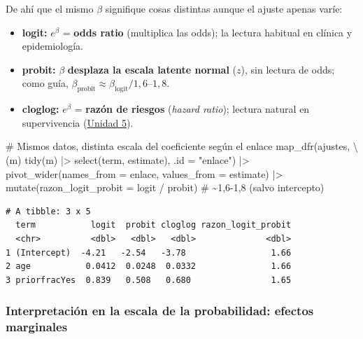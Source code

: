 \documentclass[
  letterpaper,
  DIV=11,
  numbers=noendperiod]{scrartcl}
\newenvironment{Shaded}{\begin{snugshade}}{\end{snugshade}}
\newcommand{\AttributeTok}[1]{\textcolor[rgb]{0.40,0.45,0.13}{#1}}
\newcommand{\CommentTok}[1]{\textcolor[rgb]{0.37,0.37,0.37}{#1}}
\newcommand{\FunctionTok}[1]{\textcolor[rgb]{0.28,0.35,0.67}{#1}}
\newcommand{\NormalTok}[1]{\textcolor[rgb]{0.00,0.23,0.31}{#1}}
\newcommand{\SpecialCharTok}[1]{\textcolor[rgb]{0.37,0.37,0.37}{#1}}
\newcommand{\StringTok}[1]{\textcolor[rgb]{0.13,0.47,0.30}{#1}}
\providecommand{\tightlist}{%
  \setlength{\itemsep}{0pt}\setlength{\parskip}{0pt}}\usepackage{longtable,booktabs,array}
\begin{document}
De ahí que el mismo \(\beta\) signifique cosas distintas aunque el
ajuste apenas varíe:

\begin{itemize}
\tightlist
\item
  \textbf{logit:} \(e^{\beta}\) = \textbf{odds ratio} (multiplica las
  odds); la lectura habitual en clínica y epidemiología.
\item
  \textbf{probit:} \(\beta\) \textbf{desplaza la escala latente normal}
  (\(z\)), sin lectura de odds; como guía,
  \(\beta_{\text{probit}}\approx\beta_{\text{logit}}/1{,}6\text{–}1{,}8\).
\item
  \textbf{cloglog:} \(e^{\beta}\) = \textbf{razón de riesgos}
  (\emph{hazard ratio}); lectura natural en supervivencia
  (\protect\hyperlink{sec-u15}{Unidad 5}).
\end{itemize}

\begin{Shaded}
\begin{Highlighting}[]
\CommentTok{\# Mismos datos, distinta escala del coeficiente según el enlace}
\FunctionTok{map\_dfr}\NormalTok{(ajustes, \textbackslash{}(m) }\FunctionTok{tidy}\NormalTok{(m) }\SpecialCharTok{|\textgreater{}} \FunctionTok{select}\NormalTok{(term, estimate), }\AttributeTok{.id =} \StringTok{"enlace"}\NormalTok{) }\SpecialCharTok{|\textgreater{}}
  \FunctionTok{pivot\_wider}\NormalTok{(}\AttributeTok{names\_from =}\NormalTok{ enlace, }\AttributeTok{values\_from =}\NormalTok{ estimate) }\SpecialCharTok{|\textgreater{}}
  \FunctionTok{mutate}\NormalTok{(}\AttributeTok{razon\_logit\_probit =}\NormalTok{ logit }\SpecialCharTok{/}\NormalTok{ probit)   }\CommentTok{\# \textasciitilde{}1,6{-}1,8 (salvo intercepto)}
\end{Highlighting}
\end{Shaded}

\begin{verbatim}
# A tibble: 3 x 5
  term           logit  probit cloglog razon_logit_probit
  <chr>          <dbl>   <dbl>   <dbl>              <dbl>
1 (Intercept)  -4.21   -2.54   -3.78                 1.66
2 age           0.0412  0.0248  0.0332               1.66
3 priorfracYes  0.839   0.508   0.680                1.65
\end{verbatim}

\hypertarget{interpretaciuxf3n-en-la-escala-de-la-probabilidad-efectos-marginales}{%
\subsubsection{Interpretación en la escala de la probabilidad: efectos
marginales}\label{interpretaciuxf3n-en-la-escala-de-la-probabilidad-efectos-marginales}}
\end{document}
